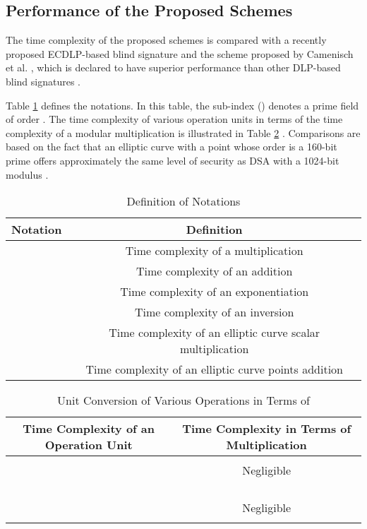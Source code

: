 \documentclass[journal,onecolumn,draftcls]{IEEEtran}
\begin{document}
\subsection{Performance of the Proposed Schemes}
The time complexity of the proposed schemes is compared with a recently proposed ECDLP-based blind signature \cite{Nikooghadam} and the scheme proposed by Camenisch et al. \cite{Camenisch}, which is declared to have superior performance than other DLP-based blind signatures \cite{Ting}.

Table \ref{tb:notations} defines the notations. In this table, the sub-index () denotes a prime field of order . The time complexity of various operation units in terms of the time complexity of a modular multiplication is illustrated in Table \ref{tb:conversion} \cite{Chung}. Comparisons are based on the fact that an elliptic curve  with a point  whose order is a 160-bit prime offers approximately the same level of security as DSA with a 1024-bit modulus  \cite{Koblitz2}.

\begin{table}[!t]
\caption{Definition of Notations}
\label{tb:notations}
\centering
\begin{tabular}{|c|c|}
\hline
\bfseries \textbf{Notation} & \textbf{Definition}\\
\hline
 & Time complexity of a multiplication \\
\hline
 & Time complexity of an addition \\
\hline
 & Time complexity of an exponentiation \\
\hline
 & Time complexity of an inversion \\
\hline
 & Time complexity of an elliptic curve scalar multiplication \\
\hline
 & Time complexity of an elliptic curve points addition \\
\hline
\end{tabular}
\end{table}


\begin{table}[!t]
\caption{Unit Conversion of Various Operations in Terms of }
\label{tb:conversion}
\centering
\begin{tabular}{|c|c|}
\hline
\bfseries \textbf{Time Complexity of an Operation Unit} & \textbf{Time Complexity in Terms of Multiplication}\\
\hline
	&   \\
\hline
	& Negligible \\
\hline
	&   \\
\hline
 &  \\
\hline
 &  \\
\hline
 &  \\
\hline
 &	Negligible \\
\hline
 &   \\
\hline
\end{tabular}
\end{table}
\end{document}
